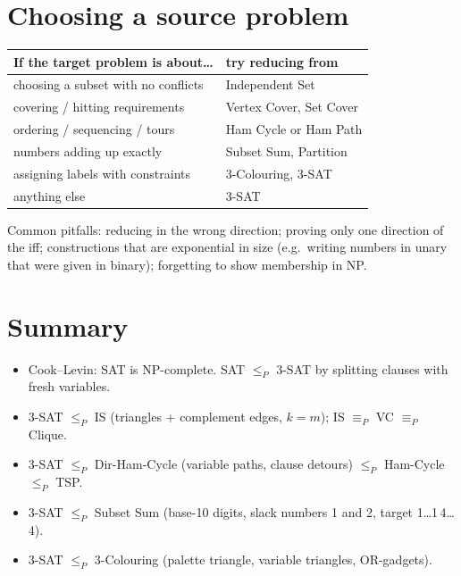 \section{Choosing a source problem}
\begin{center}
\begin{tabular}{ll}
\toprule
If the target problem is about\dots & try reducing from \\
\midrule
choosing a subset with no conflicts & Independent Set \\
covering / hitting requirements & Vertex Cover, Set Cover \\
ordering / sequencing / tours & Ham Cycle or Ham Path \\
numbers adding up exactly & Subset Sum, Partition \\
assigning labels with constraints & 3-Colouring, 3-SAT \\
anything else & 3-SAT \\
\bottomrule
\end{tabular}
\end{center}
Common pitfalls: reducing in the wrong direction; proving only one direction of the iff; constructions that are exponential in size (e.g.\ writing numbers in unary
that were given in binary); forgetting to show membership in NP.

\section*{Summary}
\begin{itemize}
  \item Cook--Levin: SAT is NP-complete. SAT $\le_P$ 3-SAT by splitting clauses with fresh variables.
  \item 3-SAT $\le_P$ IS (triangles + complement edges, $k=m$); IS $\equiv_P$ VC $\equiv_P$ Clique.
  \item 3-SAT $\le_P$ Dir-Ham-Cycle (variable paths, clause detours) $\le_P$ Ham-Cycle $\le_P$ TSP.
  \item 3-SAT $\le_P$ Subset Sum (base-10 digits, slack numbers 1 and 2, target 1\dots1\,4\dots4).
  \item 3-SAT $\le_P$ 3-Colouring (palette triangle, variable triangles, OR-gadgets).
\end{itemize}
